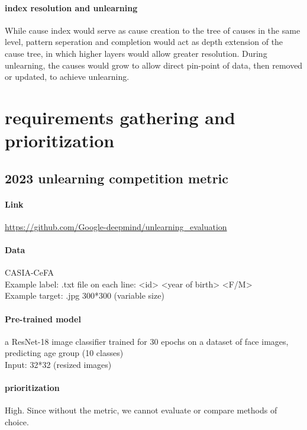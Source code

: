 \documentclass{surreydissertation}
\begin{document}
\paragraph{index resolution and unlearning} While cause index would serve as cause creation to the tree of causes in the same level, pattern seperation and completion would act as depth extension of the cause tree, in which higher layers would allow greater resolution. During unlearning, the causes would grow to allow direct pin-point of data, then removed or updated, to achieve unlearning.



\section{requirements gathering and prioritization}
\subsection{2023 unlearning competition metric}
    \paragraph{Link} 

    \url{https://github.com/Google-deepmind/unlearning_evaluation}

    \paragraph{Data} CASIA-CeFA \cite{liu2021casia,liu2021cross} \\
    Example label: .txt file on each line: <id> <year of birth> <F/M> \\
    Example target: .jpg 300*300 (variable size)

    \paragraph{Pre-trained model} 
    a ResNet-18 image classifier trained for 30 epochs on a dataset of face images, predicting age group (10 classes) \\
    Input: 32*32 (resized images)

    \paragraph{prioritization}
    High. Since without the metric, we cannot evaluate or compare methods of choice.
\end{document}
